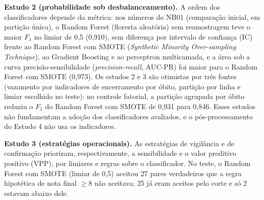 \documentclass[12pt,a4paper]{article}
\begin{document}
\textbf{Estudo 2 (probabilidade sob desbalanceamento).} A ordem dos classificadores depende da métrica: nos números do NB01 (comparação inicial, em partição única), o Random Forest (floresta aleatória) sem reamostragem teve o maior $F_1$ no limiar de 0,5 (0,910), sem diferença por intervalo de confiança (IC) frente ao Random Forest com SMOTE (\textit{Synthetic Minority Over-sampling Technique}), ao Gradient Boosting e ao perceptron multicamada, e a área sob a curva precisão-sensibilidade (\textit{precision-recall}, AUC-PR) foi maior para o Random Forest com SMOTE (0,973). %
Os estudos 2 e 3 são otimistas por três fontes (vazamento por indicadores de encerramento por óbito, partição por linha e limiar escolhido no teste): no controle fatorial, a partição agrupada por óbito reduziu o $F_1$ do Random Forest com SMOTE de 0,931 para 0,846. Esses estudos não fundamentam a adoção dos classificadores avaliados, e o pós-processamento do Estudo 4 não usa os indicadores. %

\textbf{Estudo 3 (estratégias operacionais).} As estratégias de vigilância e de confirmação priorizam, respectivamente, a sensibilidade e o valor preditivo positivo (VPP), por limiares e regras sobre o classificador. No teste, o Random Forest com SMOTE (limiar de 0,5) aceitou 27 pares verdadeiros que a regra hipotética de nota final $\geq 8$ não aceitava; 25 já eram aceitos pelo corte e só 2 estavam abaixo dele. %
\end{document}
